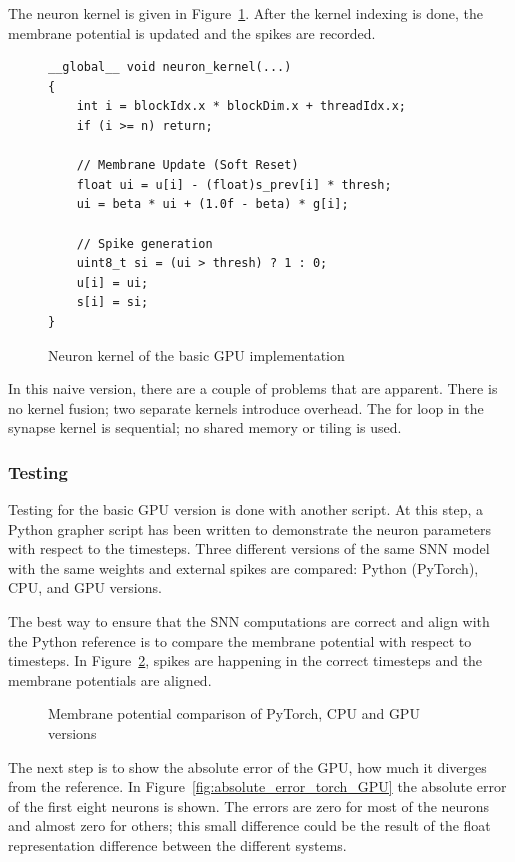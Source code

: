 \documentclass[conference]{IEEEtran}
\begin{document}
The neuron kernel is given in Figure~\ref{fig:Neuron_Basic_GPU_impl}. After the kernel indexing is done, the membrane potential is updated and the spikes are recorded.

\begin{figure}[h]
\centering
\begin{lstlisting}
__global__ void neuron_kernel(...)
{
    int i = blockIdx.x * blockDim.x + threadIdx.x;
    if (i >= n) return;

    // Membrane Update (Soft Reset)
    float ui = u[i] - (float)s_prev[i] * thresh;
    ui = beta * ui + (1.0f - beta) * g[i];

    // Spike generation
    uint8_t si = (ui > thresh) ? 1 : 0;
    u[i] = ui;
    s[i] = si;
}
\end{lstlisting}
\caption{Neuron kernel of the basic GPU implementation}
\label{fig:Neuron_Basic_GPU_impl}
\end{figure}

In this naive version, there are a couple of problems that are apparent. There is no kernel fusion; two separate kernels introduce overhead. The for loop in the synapse kernel is sequential; no shared memory or tiling is used.

\subsubsection{Testing}

Testing for the basic GPU version is done with another script. At this step, a Python grapher script has been written to demonstrate the neuron parameters with respect to the timesteps. Three different versions of the same SNN model with the same weights and external spikes are compared: Python (PyTorch), CPU, and GPU versions.

The best way to ensure that the SNN computations are correct and align with the Python reference is to compare the membrane potential with respect to timesteps. In Figure~\ref{fig:membrane_comp_Torch_CPU_GPU}, spikes are happening in the correct timesteps and the membrane potentials are aligned.

\begin{figure}[H]
  \centering
  \caption{Membrane potential comparison of PyTorch, CPU and GPU versions}
  \label{fig:membrane_comp_Torch_CPU_GPU}
\end{figure}

The next step is to show the absolute error of the GPU, how much it diverges from the reference. In Figure~\ref{fig:absolute_error_torch_GPU} the absolute error of the first eight neurons is shown. The errors are zero for most of the neurons and almost zero for others; this small difference could be the result of the float representation difference between the different systems.
\end{document}
